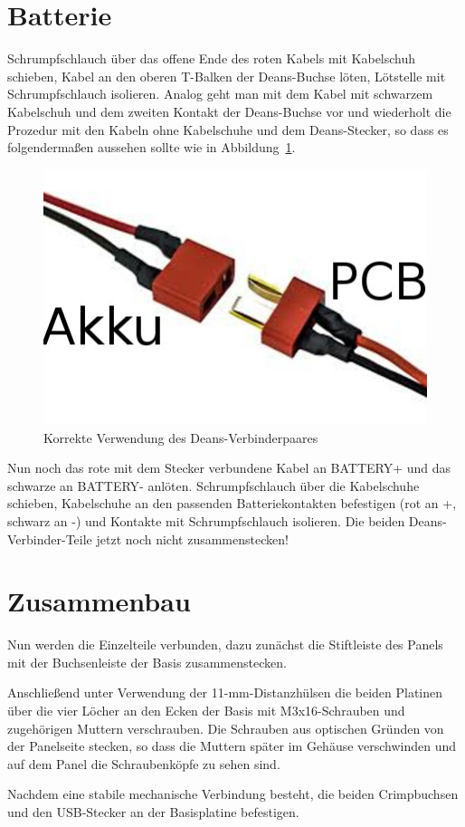 \documentclass[paper=a4, open=any]{scrbook}
\begin{document}
		\section{Batterie}

			Schrumpfschlauch über das offene Ende des roten Kabels mit Kabelschuh schieben, Kabel an den oberen T-Balken der Deans-Buchse löten, Lötstelle mit Schrumpfschlauch isolieren. Analog geht man mit dem Kabel mit schwarzem Kabelschuh und dem zweiten Kontakt der Deans-Buchse vor und wiederholt die Prozedur mit den Kabeln ohne Kabelschuhe und dem Deans-Stecker, so dass es folgendermaßen aussehen sollte wie in Abbildung~\ref{fig:deans}.
			\begin{figure}
				\centering\includegraphics[width=.5\textwidth]{deans}
				\caption{Korrekte Verwendung des Deans-Verbinder\-paares}
				\label{fig:deans}
			\end{figure}

			Nun noch das rote mit dem Stecker verbundene Kabel an BATTERY+ und das schwarze an BATTERY- anlöten. Schrumpfschlauch über die Kabelschuhe schieben, Kabelschuhe an den passenden Batteriekontakten befestigen (rot an +, schwarz an -) und Kontakte mit Schrumpfschlauch isolieren. Die beiden Deans-Verbinder-Teile jetzt noch nicht zusammenstecken!


		\section{Zusammenbau}
			Nun werden die Einzelteile verbunden, dazu zunächst die Stiftleiste des Panels mit der Buchsenleiste der Basis zusammenstecken.

			Anschließend unter Verwendung der 11-mm-Distanzhülsen die beiden Platinen über die vier Löcher an den Ecken der Basis mit M3x16-Schrauben und zugehörigen Muttern verschrauben. Die Schrauben aus optischen Gründen von der Panelseite stecken, so dass die Muttern später im Gehäuse verschwinden und auf dem Panel die Schraubenköpfe zu sehen sind.

			Nachdem eine stabile mechanische Verbindung besteht, die beiden Crimpbuchsen und den USB-Stecker an der Basisplatine befestigen.
\end{document}
